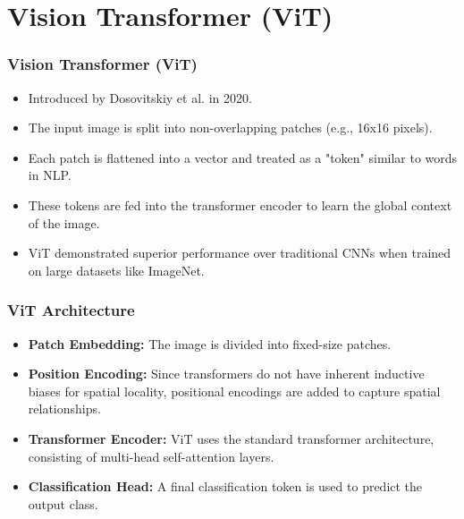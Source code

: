 \documentclass{beamer}
\begin{document}

\section{Vision Transformer (ViT)}
\begin{frame}
\frametitle{Vision Transformer (ViT)}
\begin{itemize}
    \item Introduced by Dosovitskiy et al. in 2020.
    \item The input image is split into non-overlapping patches (e.g., 16x16 pixels).
    \item Each patch is flattened into a vector and treated as a "token" similar to words in NLP.
    \item These tokens are fed into the transformer encoder to learn the global context of the image.
    \item ViT demonstrated superior performance over traditional CNNs when trained on large datasets like ImageNet.
\end{itemize}
\end{frame}


\begin{frame}
\frametitle{ViT Architecture}
\begin{itemize}
    \item \textbf{Patch Embedding:} The image is divided into fixed-size patches.
    \item \textbf{Position Encoding:} Since transformers do not have inherent inductive biases for spatial locality, positional encodings are added to capture spatial relationships.
    \item \textbf{Transformer Encoder:} ViT uses the standard transformer architecture, consisting of multi-head self-attention layers.
    \item \textbf{Classification Head:} A final classification token is used to predict the output class.
\end{itemize}
\end{frame}
\end{document}
